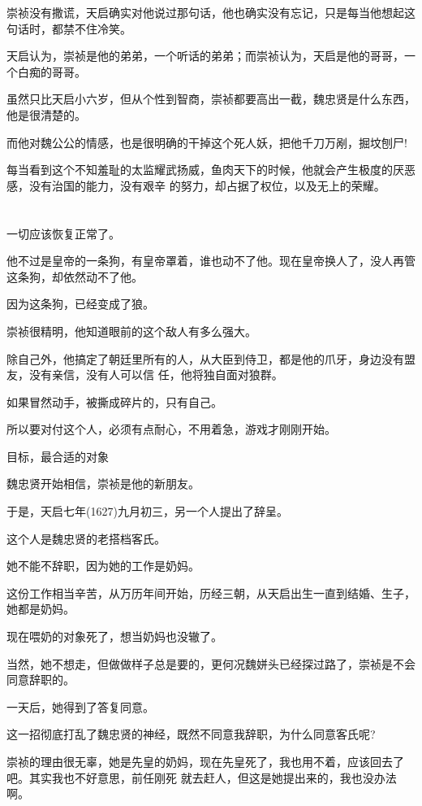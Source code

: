 \documentclass[11pt,a4paper,onecolumn]{article}
\begin{document}
崇祯没有撒谎，天启确实对他说过那句话，他也确实没有忘记，只是每当他想起这句话时，都禁不住冷笑。

天启认为，崇祯是他的弟弟，一个听话的弟弟；而崇祯认为，天启是他的哥哥，一个白痴的哥哥。

虽然只比天启小六岁，但从个性到智商，崇祯都要高出一截，魏忠贤是什么东西，他是很清楚的。

而他对魏公公的情感，也是很明确的\myrule 干掉这个死人妖，把他千刀万剐，掘坟刨尸!

每当看到这个不知羞耻的太监耀武扬威，鱼肉天下的时候，他就会产生极度的厌恶感，没有治国的能力，没有艰辛
的努力，却占据了权位，以及无上的荣耀。

\section[\thesection]{}

一切应该恢复正常了。

他不过是皇帝的一条狗，有皇帝罩着，谁也动不了他。现在皇帝换人了，没人再管这条狗，却依然动不了他。

因为这条狗，已经变成了狼。

崇祯很精明，他知道眼前的这个敌人有多么强大。

除自己外，他搞定了朝廷里所有的人，从大臣到侍卫，都是他的爪牙，身边没有盟友，没有亲信，没有人可以信
任，他将独自面对狼群。

如果冒然动手，被撕成碎片的，只有自己。

所以要对付这个人，必须有点耐心，不用着急，游戏才刚刚开始。

目标，最合适的对象

魏忠贤开始相信，崇祯是他的新朋友。

于是，天启七年(1627)九月初三，另一个人提出了辞呈。

这个人是魏忠贤的老搭档客氏。

她不能不辞职，因为她的工作是奶妈。

这份工作相当辛苦，从万历年间开始，历经三朝，从天启出生一直到结婚、生子，她都是奶妈。

现在喂奶的对象死了，想当奶妈也没辙了。

当然，她不想走，但做做样子总是要的，更何况魏姘头已经探过路了，崇祯是不会同意辞职的。

一天后，她得到了答复\myrule 同意。

这一招彻底打乱了魏忠贤的神经，既然不同意我辞职，为什么同意客氏呢?

崇祯的理由很无辜，她是先皇的奶妈，现在先皇死了，我也用不着，应该回去了吧。其实我也不好意思，前任刚死
就去赶人，但这是她提出来的，我也没办法啊。
\end{document}
